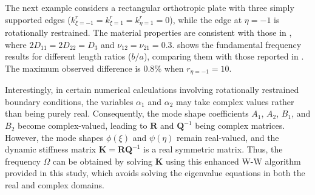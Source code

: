 \documentclass[preprint,12pt,number]{elsarticle}
\begin{document}
The next example considers a rectangular orthotropic plate with three simply supported edges ($k^r_{\xi=-1} = k^r_{\xi=1} = k^r_{\eta=1} = 0$), while the edge at $\eta = -1$ is rotationally restrained. 
The material properties are consistent with those in \citealp{zhang2019new}, where $2D_{11} = 2D_{22} = D_3$ and $\nu_{12} = \nu_{21} = 0.3$.  
 shows the fundamental frequency results for different length ratios ($b/a$), comparing them with those reported in \citealp{zhang2019new}. 
The maximum observed difference is $0.8\%$ when $r_{\eta=-1} = 10$. 

Interestingly, in certain numerical calculations involving rotationally restrained boundary conditions, the variables $\alpha_1$ and $\alpha_2$ may take complex values rather than being purely real.  
Consequently, the mode shape coefficients $A_1$, $A_2$, $B_1$, and $B_2$ become complex-valued, leading to $\mathbf{R}$ and $\mathbf{Q}^{-1}$ being complex matrices.  
However, the mode shapes $\phi(\xi)$ and $\psi(\eta)$ remain real-valued, and the dynamic stiffness matrix $\mathbf{K} = \mathbf{R}\mathbf{Q}^{-1}$ is a real symmetric matrix.
Thus, the frequency $\Omega$ can be obtained by solving $\mathbf{K}$ using this enhanced W-W algorithm provided in this study, which avoids solving the eigenvalue equations in both the real and complex domains.
\end{document}
